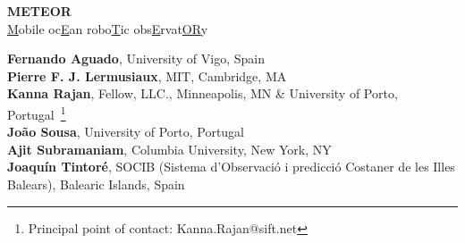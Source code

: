 \begin{titlepage}

  \begin{center}

    
    \Large{\textbf{METEOR}\\
      \underline{M}obile oc\underline{E}an robo\underline{T}ic obs\underline{E}rvat\underline{OR}y}

  \vspace{+5in}
  \large
  \textbf{Fernando Aguado}, University of Vigo, Spain\\
  \textbf{Pierre F. J. Lermusiaux}, MIT, Cambridge, MA\\
  \textbf{Kanna Rajan}, Fellow, \org LLC., Minneapolis, MN \& University of Porto, Portugal~\footnote{Principal point of
    contact: Kanna.Rajan@sift.net}\\
  \textbf{Jo\~ao Sousa}, University of Porto, Portugal\\
  \textbf{Ajit Subramaniam}, Columbia University, New York, NY\\
  \textbf{Joaqu\'{i}n Tintor\'{e}}, SOCIB (Sistema d’Observaci\'{o} i predicci\'{o} Costaner de les Illes Balears), Balearic Islands, Spain\\
  \vspace{+0.2in}



\end{center}
\end{titlepage}
